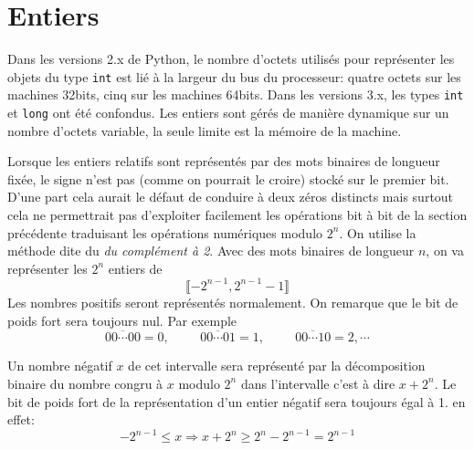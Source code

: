 \section{Entiers}
Dans les versions 2.x de Python, le nombre d'octets utilisés pour représenter les objets du type \verb|int| est lié à la largeur du bus du processeur:  quatre octets sur les machines 32bits, cinq sur les machines 64bits. Dans les versions 3.x, les types \verb|int| et \verb|long| ont été confondus. Les entiers sont gérés de manière dynamique sur un nombre d'octets variable, la seule limite est la mémoire de la machine.

Lorsque les entiers relatifs sont représentés par des mots binaires de longueur fixée, le signe n'est pas (comme on pourrait le croire) stocké sur le premier bit. D'une part cela aurait le défaut de conduire à deux zéros distincts mais surtout cela ne permettrait pas d'exploiter facilement les opérations bit à bit de la section précédente traduisant les opérations numériques modulo $2^n$.\newline 
On utilise la méthode dite du \emph{du complément à 2}.\newline
Avec des mots binaires de longueur $n$, on va représenter les $2^n$ entiers de 
\begin{displaymath}
  \llbracket -2^{n-1}, 2^{n-1}-1 \rrbracket
\end{displaymath}
Les nombres positifs seront représentés normalement. On remarque que le bit de poids fort sera toujours nul. Par exemple
\begin{displaymath}
  \overline{00\cdots00} = 0, \hspace{1cm}\overline{00\cdots01} = 1, \hspace{1cm}\overline{00\cdots10} = 2, \cdots
\end{displaymath}

Un nombre négatif $x$ de cet intervalle sera représenté par la décomposition binaire du nombre congru à $x$ modulo $2^{n}$ dans l'intervalle c'est à dire $x + 2^n$.\newline
Le bit de poids fort de la représentation d'un entier négatif sera toujours égal à 1. en effet:
\begin{displaymath}
  -2^{n-1} \leq x \Rightarrow x + 2^n \geq 2^n - 2^{n-1} = 2^{n-1}
\end{displaymath}

